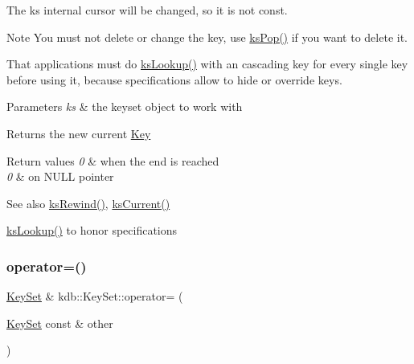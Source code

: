The {\ttfamily ks} internal cursor will be changed, so it is not const.

\begin{DoxyNote}{Note}
You must not delete or change the key, use \hyperlink{group__keyset_gae42530b04defb772059de0600159cf69}{ks\+Pop()} if you want to delete it.

That applications must do \hyperlink{group__keyset_ga60f1ddcf23272f2b29b90e92ebe9b56f}{ks\+Lookup()} with an cascading key for every single key before using it, because specifications allow to hide or override keys.
\end{DoxyNote}

\begin{DoxyParams}{Parameters}
{\em ks} & the keyset object to work with \\
\hline
\end{DoxyParams}
\begin{DoxyReturn}{Returns}
the new current \hyperlink{classkdb_1_1Key}{Key} 
\end{DoxyReturn}

\begin{DoxyRetVals}{Return values}
{\em 0} & when the end is reached \\
\hline
{\em 0} & on N\+U\+LL pointer \\
\hline
\end{DoxyRetVals}
\begin{DoxySeeAlso}{See also}
\hyperlink{group__keyset_gabe793ff51f1728e3429c84a8a9086b70}{ks\+Rewind()}, \hyperlink{group__keyset_ga4287b9416912c5f2ab9c195cb74fb094}{ks\+Current()} 

\hyperlink{group__keyset_ga60f1ddcf23272f2b29b90e92ebe9b56f}{ks\+Lookup()} to honor specifications 
\end{DoxySeeAlso}
\mbox{\label{classkdb_1_1KeySet_a1c54736b7206bc2253d02a5bf4b3ccfb}} 
\subsubsection{\texorpdfstring{operator=()}{operator=()}}
{\footnotesize\ttfamily \hyperlink{classkdb_1_1KeySet}{Key\+Set} \& kdb\+::\+Key\+Set\+::operator= (\begin{DoxyParamCaption}\item[{\hyperlink{classkdb_1_1KeySet}{Key\+Set} const \&}]{other }\end{DoxyParamCaption})\hspace{0.3cm}{\ttfamily [inline]}}



